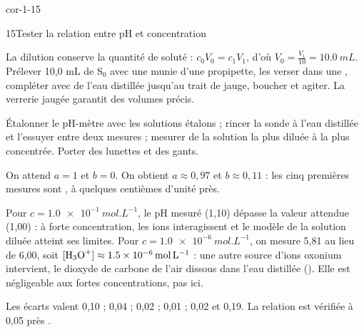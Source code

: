 \begin{blocLivre}{cor-1-15}
\begin{corrige}{15}{Tester la relation entre pH et concentration}
\begin{questions}
\item La dilution conserve la quantité de soluté : $c_0V_0=c_1V_1$, d'où $V_0=\frac{V_1}{10}=\qty{10,0}{mL}$.
Prélever 10,0 mL de S$_0$ avec une  munie d'une propipette, les verser
dans une , compléter avec de l'eau distillée jusqu'au trait de jauge,
boucher et agiter. La verrerie jaugée garantit des volumes précis.
\item Étalonner le pH-mètre avec les solutions étalons ; rincer la sonde à l'eau distillée et l'essuyer
entre deux mesures ; mesurer de la solution la plus diluée à la plus concentrée. Porter des lunettes et des gants.
\item On attend $a=1$ et $b=0$. On obtient $a\approx0{,}97$ et $b\approx0{,}11$ : les cinq premières mesures
sont , à quelques centièmes d'unité près.
\item Pour $c=\qty{1,0e-1}{mol.L^{-1}}$, le pH mesuré (1,10) dépasse la valeur attendue (1,00) : à forte
concentration, les ions interagissent et le modèle de la solution diluée atteint ses limites.
Pour $c=\qty{1,0e-6}{mol.L^{-1}}$, on mesure 5,81 au lieu de 6,00, soit $\hho\approx\qty{1,5e-6}{mol.L^{-1}}$ :
une autre source d'ions oxonium intervient, le dioxyde de carbone de l'air dissous dans l'eau distillée
(). Elle est négligeable aux fortes concentrations, pas ici.
\item Les écarts valent 0,10 ; 0,04 ; 0,02 ; 0,01 ; 0,02 et 0,19. La relation est vérifiée à 0,05 près
.
\end{questions}
\end{corrige}
\end{blocLivre}

